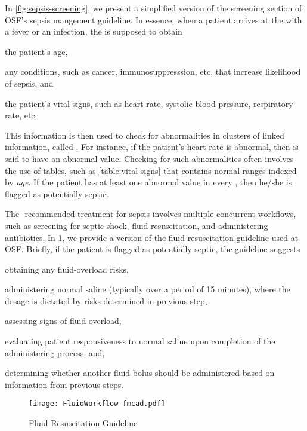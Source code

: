 In \figurename{} \ref{fig:sepsis-screening}, we present a simplified version of
the screening section of OSF's sepsis mangement guideline.
In essence, when a patient arrives at the
\ED{} with a fever or an infection, the \HCP{} is supposed to obtain
\begin{enumerate*}[label=(\alph*)]
  \item the patient's age,
  \item any conditions, such as cancer, immunosuppresssion, etc,
    that increase likelihood of sepsis, and
  \item the patient's vital signs, such as heart rate, systolic blood
    pressure, respiratory rate, etc.
\end{enumerate*}

This information is then used to check for abnormalities
in clusters of linked information, called . For instance, if
the patient's heart rate is abnormal, then  is said to
have an abnormal value.
Checking for such abnormalities often involves the use of tables, such as
\tablename{} \ref{table:vital-signs} that contains normal ranges indexed by
\emph{age}.
If the patient has at least one abnormal value in every ,
then he/she is flagged as potentially septic.

The \BPG{}-recommended treatment for
sepsis involves multiple concurrent workflows, such as
screening for septic shock, fluid resuscitation, and administering antibiotics.
In \figurename{} \ref{fig:fluid-therapy}, we provide
a version of the fluid resuscitation guideline used
at OSF. Briefly, if the patient is flagged as potentially septic, the guideline suggests
\begin{enumerate*}[label=(\roman*)]
  \item obtaining any fluid-overload risks,
  \item administering normal saline (typically over a period of 15 minutes),
    where the dosage is dictated by risks determined in previous step,
  \item assessing signs of fluid-overload,
  \item evaluating patient responsiveness to normal saline upon completion of
    the administering process, and,
  \item determining whether another fluid bolus should be administered based on
    information from previous steps.
\end{enumerate*}
\begin{figure}[h]
  \centering
  \texttt{[image: FluidWorkflow-fmcad.pdf]}
  \caption{Fluid Resuscitation Guideline}\label{fig:fluid-therapy}
\end{figure}

